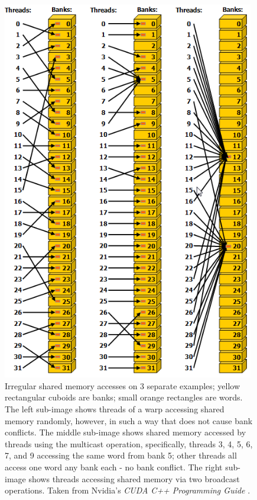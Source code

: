 \begin{figure}[ht!]
	\centering
	\includegraphics[width=11cm, keepaspectratio]{images/ch1/CUDA_shared_memory_banks_words_no_conflicts.png}
	\caption{Irregular shared memory accesses on 3 separate examples; yellow rectangular cuboids are banks; small orange rectangles are words. The left sub-image shows threads of a warp accessing shared memory randomly, however, in such a way that does not cause bank conflicts. The middle sub-image shows shared memory accessed by threads using the multicast operation, specifically, threads 3, 4, 5, 6, 7, and 9 accessing the same word from bank 5; other threads all access one word any bank each - no bank conflict. The right sub-image shows threads accessing shared memory via two broadcast operations. Taken from Nvidia's \emph{CUDA C++ Programming Guide} \cite{NVIDIAMay2022}.}
	\label{Figure:theory-CUDA-shared-memory-banks-words-no-conflicts}
\end{figure}

